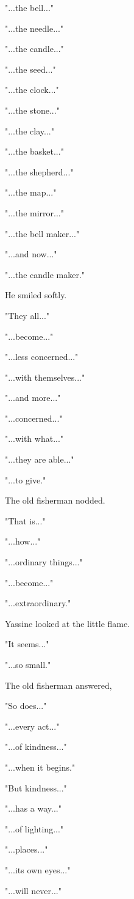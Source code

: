 \documentclass[12pt,openany]{book}
\begin{document}
"...the bell..."

"...the needle..."

"...the candle..."

"...the seed..."

"...the clock..."

"...the stone..."

"...the clay..."

"...the basket..."

"...the shepherd..."

"...the map..."

"...the mirror..."

"...the bell maker..."

"...and now..."

"...the candle maker."

He smiled softly.

"They all..."

"...become..."

"...less concerned..."

"...with themselves..."

"...and more..."

"...concerned..."

"...with what..."

"...they are able..."

"...to give."

The old fisherman nodded.

"That is..."

"...how..."

"...ordinary things..."

"...become..."

"...extraordinary."

Yassine looked at the little flame.

"It seems..."

"...so small."

The old fisherman answered,

"So does..."

"...every act..."

"...of kindness..."

"...when it begins."

"But kindness..."

"...has a way..."

"...of lighting..."

"...places..."

"...its own eyes..."

"...will never..."
\end{document}
